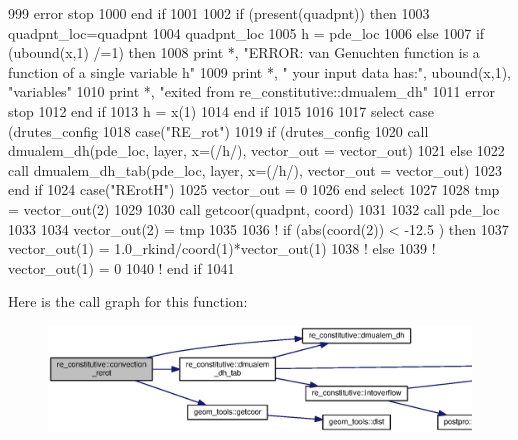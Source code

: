 \begin{DoxyCode}
999         error stop
1000 \textcolor{keywordflow}{      end if}
1001       
1002       \textcolor{keywordflow}{if} (\textcolor{keyword}{present}(quadpnt)) \textcolor{keywordflow}{then}
1003         quadpnt\_loc=quadpnt
1004         quadpnt\_loc%
1005         h = pde\_loc%
1006       \textcolor{keywordflow}{else}
1007         \textcolor{keywordflow}{if} (ubound(x,1) /=1) \textcolor{keywordflow}{then}
1008           print *, \textcolor{stringliteral}{"ERROR: van Genuchten function is a function of a single variable h"}
1009           print *, \textcolor{stringliteral}{"       your input data has:"}, ubound(x,1), \textcolor{stringliteral}{"variables"}
1010           print *, \textcolor{stringliteral}{"exited from re\_constitutive::dmualem\_dh"}
1011           error stop
1012 \textcolor{keywordflow}{        end if}
1013         h = x(1)
1014 \textcolor{keywordflow}{      end if}
1015       
1016 
1017       \textcolor{keywordflow}{select case} (drutes_config%
1018         \textcolor{keywordflow}{case}(\textcolor{stringliteral}{"RE\_rot"})
1019           \textcolor{keywordflow}{if} (drutes_config%
1020             \textcolor{keyword}{call }dmualem_dh(pde\_loc, layer, x=(/h/), vector\_out = vector\_out)
1021           \textcolor{keywordflow}{else}
1022             \textcolor{keyword}{call }dmualem_dh_tab(pde\_loc, layer, x=(/h/), vector\_out = vector\_out\textcolor{comment}{)}
1023 \textcolor{comment}{}\textcolor{keywordflow}{          end if}
1024         \textcolor{keywordflow}{case}(\textcolor{stringliteral}{"RErotH"})
1025           vector\_out = 0
1026 \textcolor{keywordflow}{      end select}
1027       
1028       tmp = vector\_out(2)
1029       
1030       \textcolor{keyword}{call }getcoor(quadpnt, coord)
1031       
1032       \textcolor{keyword}{call }pde\_loc%
1033       
1034       vector\_out(2) = tmp
1035       
1036 \textcolor{comment}{!       if (abs(coord(2)) < -12.5 ) then}
1037         vector\_out(1) =  1.0\_rkind/coord(1)*vector\_out(1)       
1038 \textcolor{comment}{!       else}
1039 \textcolor{comment}{!       vector\_out(1) = 0}
1040 \textcolor{comment}{!       end if}
1041 
\end{DoxyCode}


Here is the call graph for this function\+:\nopagebreak
\begin{figure}[H]
\begin{center}
\leavevmode
\includegraphics[width=350pt]{namespacere__constitutive_a060c1f794f98499dd22932984f0b97e8_cgraph}
\end{center}
\end{figure}




